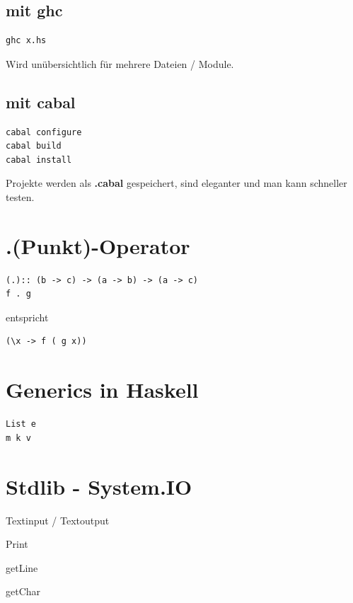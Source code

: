 \documentclass[ngerman,a4paper]{report}
\begin{document}
\subsection{mit ghc}
\begin{lstlisting}
ghc x.hs
\end{lstlisting}
Wird unübersichtlich für mehrere Dateien / Module.

\subsection{mit cabal}
\begin{lstlisting}
cabal configure
cabal build
cabal install
\end{lstlisting}

Projekte werden als \textbf{.cabal} gespeichert, sind eleganter und man kann schneller testen.

\section{.(Punkt)-Operator}
\begin{lstlisting}
(.):: (b -> c) -> (a -> b) -> (a -> c)
f . g
\end{lstlisting}

entspricht\\

\begin{lstlisting}
(\x -> f ( g x))
\end{lstlisting}

\section{Generics in Haskell}

\begin{lstlisting}
List e
m k v
\end{lstlisting}

\section{Stdlib - System.IO}
\begin{compactitem}
	\item Textinput / Textoutput
		\begin{compactitem}
			\item Print
			\item getLine
			\item getChar
		\end{compactitem}
\end{compactitem}
\end{document}
